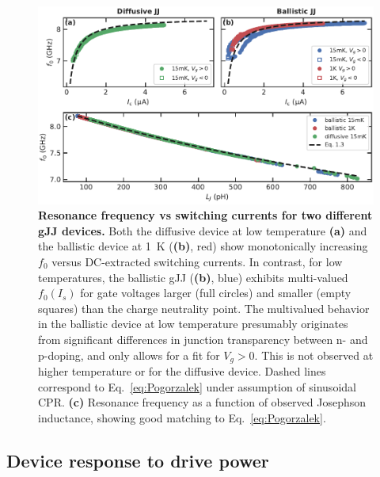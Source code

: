 \begin{figure}
	\centering
	\includegraphics[width=\linewidth]{chapter-gJJ-CPR/figs/SMFigure-f0vsIcvsLj}
	\caption{
		\textbf{Resonance frequency vs switching currents for two different gJJ devices.}
		Both the diffusive device at low temperature \textbf{(a)} and the ballistic device at \SI{1}{\kelvin} (\textbf{(b)}, red) show monotonically increasing $f_0$ versus DC-extracted switching currents.
		In contrast, for low temperatures, the ballistic gJJ (\textbf{(b)}, blue) exhibits multi-valued $f_0\left(I_s\right)$ for gate voltages larger (full circles) and smaller (empty squares) than the charge neutrality point.
		The	multivalued behavior in the ballistic device at low temperature presumably originates from significant differences in junction transparency between n- and p-doping, and only allows for a fit for $V_g>0$.
		This is not observed at higher temperature or for the diffusive device.
		Dashed lines correspond to Eq.~\ref{eq:Pogorzalek} under assumption of sinusoidal CPR.
		\textbf{(c)} Resonance frequency as a function of observed Josephson inductance, showing good matching to Eq.~\ref{eq:Pogorzalek}.
	}
	\label{fig:SMFigure-f0vsIcvsLj}
\end{figure}

\subsection{Device response to drive power}\label{sec:SMduffing}

